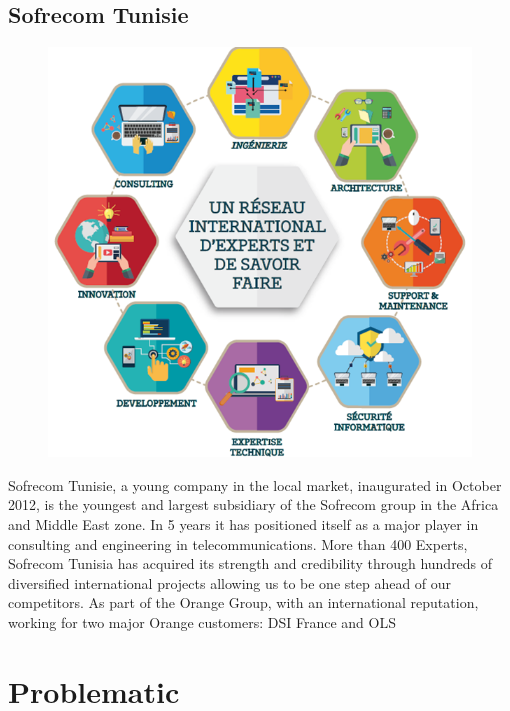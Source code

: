 \subsection{Sofrecom Tunisie}
\label{sec:sec01}
\begin{figure}[h!]
	\centering
	\includegraphics[height=0.4\textheight]{fig01/sofrecomfields}
	\label{fig:FilialesEtClients}
\end{figure}
Sofrecom Tunisie, a young company in the local market, inaugurated in October 2012, is the youngest and largest subsidiary of the Sofrecom group in the Africa and Middle East zone.
In 5 years it has positioned itself as a major player in consulting and engineering in telecommunications.
More than 400 Experts, Sofrecom Tunisia has acquired its strength and credibility through hundreds of diversified international projects allowing us to be one step ahead of our competitors.
As part of the Orange Group, with an international reputation, working for two major Orange customers: DSI France and OLS


\section{Problematic}
\label{subsec:subsec01}

